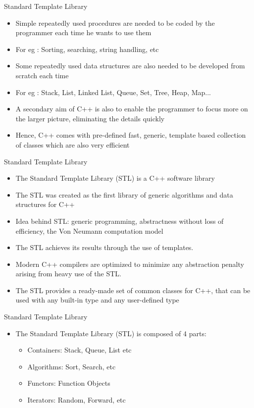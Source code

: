 \documentclass{beamer}
\begin{document}
\begin{frame}[fragile]{Standard Template Library}
  \begin{itemize}
    \item Simple repeatedly used procedures are needed to be coded by the programmer each time he wants to use them\pause
    \item For eg : Sorting, searching, string handling, etc\pause
    \item Some repeatedly used data structures are also needed to be developed from scratch each time\pause
    \item For eg : Stack, List, Linked List, Queue, Set, Tree, Heap, Map...\pause
    \item A secondary aim of C++ is also to enable the programmer to focus more on the larger picture, eliminating the details quickly\pause
    \item Hence, C++ comes with pre-defined fast, generic, template based collection of classes which are also very efficient
  \end{itemize}
\end{frame}

\begin{frame}[fragile]{Standard Template Library}
  \begin{itemize}
    \item The Standard Template Library (STL) is a C++ software library \pause
    \item The STL was created as the first library of generic algorithms and data structures for C++\pause
    \item Idea behind STL: generic programming, abstractness without loss of efficiency, the Von Neumann computation model\pause
    \item The STL achieves its results through the use of templates.\pause
    \item Modern C++ compilers are optimized to minimize any abstraction penalty arising from heavy use of the STL.\pause
    \item The STL provides a ready-made set of common classes for C++, that can be used with any built-in type and any user-defined type
  \end{itemize}
\end{frame}

\begin{frame}[fragile]{Standard Template Library}
  \begin{itemize}
  \item The Standard Template Library (STL) is composed of 4 parts:\pause
    \begin{itemize}
    \item Containers: Stack, Queue, List etc\pause
    \item Algorithms: Sort, Search, etc\pause
    \item Functors: Function Objects\pause
    \item Iterators: Random, Forward, etc
    \end{itemize}
  \end{itemize}
\end{frame}
\end{document}
